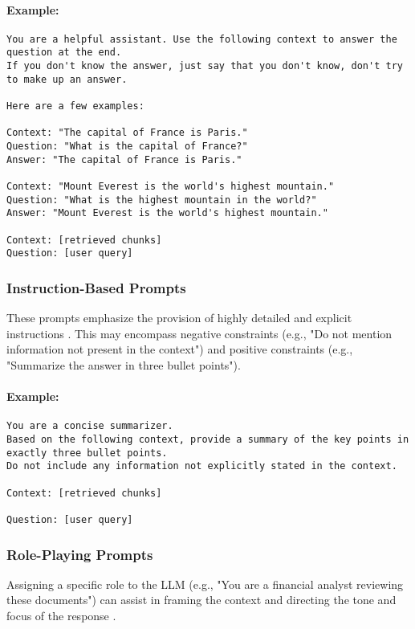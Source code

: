 \paragraph{Example:}
\begin{verbatim}
You are a helpful assistant. Use the following context to answer the question at the end.
If you don't know the answer, just say that you don't know, don't try to make up an answer.

Here are a few examples:

Context: "The capital of France is Paris."
Question: "What is the capital of France?"
Answer: "The capital of France is Paris."

Context: "Mount Everest is the world's highest mountain."
Question: "What is the highest mountain in the world?"
Answer: "Mount Everest is the world's highest mountain."

Context: [retrieved chunks]
Question: [user query]
\end{verbatim}
    
    \subsubsection{Instruction-Based Prompts}
These prompts emphasize the provision of highly detailed and explicit instructions \autocite{wei2022chain}. This may encompass negative constraints (e.g., "Do not mention information not present in the context") and positive constraints (e.g., "Summarize the answer in three bullet points").

\paragraph{Example:}
\begin{verbatim}
You are a concise summarizer.
Based on the following context, provide a summary of the key points in exactly three bullet points.
Do not include any information not explicitly stated in the context.

Context: [retrieved chunks]

Question: [user query]
\end{verbatim}
    
    \subsubsection{Role-Playing Prompts}
Assigning a specific role to the LLM (e.g., "You are a financial analyst reviewing these documents") can assist in framing the context and directing the tone and focus of the response \autocite{tseng-etal-2024-two}.

